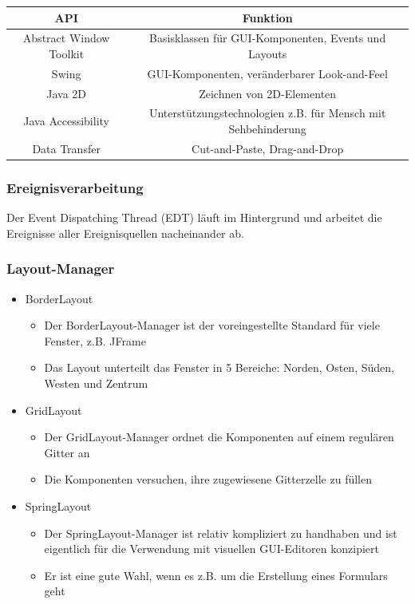\documentclass{scrartcl}
\begin{document}
\begin{tabular}{|c|c|}
	\hline \textbf{API} & \textbf{Funktion} \\ 
	\hline Abstract Window Toolkit & Basisklassen für GUI-Komponenten, Events und Layouts \\ 
	\hline Swing & GUI-Komponenten, veränderbarer Look-and-Feel \\ 
	\hline Java 2D & Zeichnen von 2D-Elementen \\ 
	\hline Java Accessibility & Unterstützungstechnologien z.B. für Mensch mit Sehbehinderung \\ 
	\hline Data Transfer & Cut-and-Paste, Drag-and-Drop \\ 
	\hline 
\end{tabular}

\subsubsection{Ereignisverarbeitung}

Der Event Dispatching Thread (EDT) läuft im Hintergrund und arbeitet die Ereignisse aller Ereignisquellen nacheinander ab.

\subsubsection{Layout-Manager}

\begin{itemize}
	\item BorderLayout
	\begin{itemize}
		\item Der BorderLayout-Manager ist der voreingestellte Standard für viele Fenster, z.B. JFrame
		\item Das Layout unterteilt das Fenster in 5 Bereiche: Norden, Osten, Süden, Westen und Zentrum
	\end{itemize}
	\item GridLayout
	\begin{itemize}
		\item Der GridLayout-Manager ordnet die Komponenten auf einem regulären Gitter an
		\item Die Komponenten versuchen, ihre zugewiesene Gitterzelle zu füllen
	\end{itemize}
	\item SpringLayout
	\begin{itemize}
		\item Der SpringLayout-Manager ist relativ kompliziert zu handhaben und ist eigentlich für die Verwendung mit visuellen GUI-Editoren konzipiert
		\item Er ist eine gute Wahl, wenn es z.B. um die Erstellung eines Formulars geht
	\end{itemize}
\end{itemize}
\end{document}
